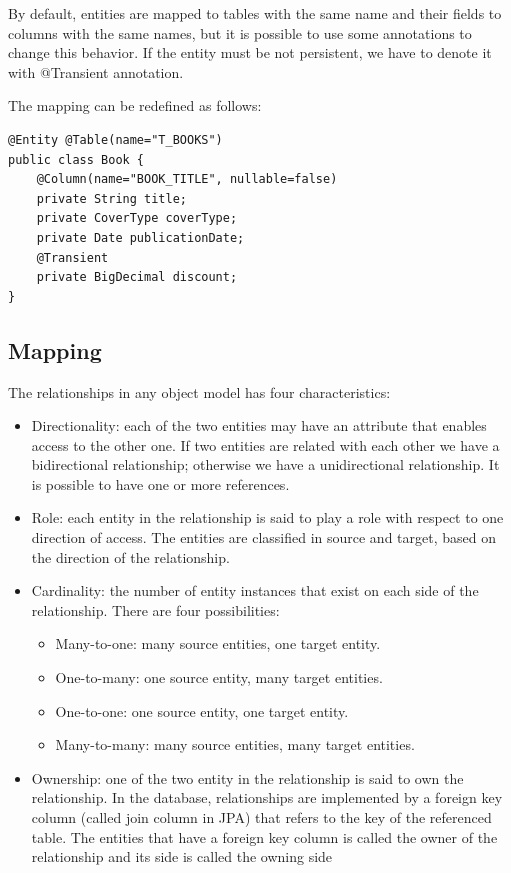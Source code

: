 \documentclass[12pt, a4paper]{report}
\begin{document}
        By default, entities are mapped to tables with the same name and their fields to columns with the same names, but it is possible to use some annotations 
        to change this behavior. If the entity must be not persistent, we have to denote it with @Transient annotation. 
        \begin{example}
            The mapping can be redefined as follows: 
            \begin{lstlisting}[style=Java]
@Entity @Table(name="T_BOOKS")
public class Book {
    @Column(name="BOOK_TITLE", nullable=false)
    private String title;
    private CoverType coverType;
    private Date publicationDate;
    @Transient
    private BigDecimal discount;
}
            \end{lstlisting}
        \end{example}

        \subsection{Mapping}
        The relationships in any object model has four characteristics:
        \begin{itemize}
            \item Directionality: each of the two entities may have an attribute that enables access to the other one. If two entities are related with each other we have 
                a bidirectional relationship; otherwise we have a unidirectional relationship. It is possible to have one or more references. 
            \item Role: each entity in the relationship is said to play a role with respect to one direction of access. The entities are classified in source and target,
                based on the direction of the relationship. 
            \item Cardinality: the number of entity instances that exist on each side of the relationship. There are four possibilities: 
                \begin{itemize}
                    \item Many-to-one: many source entities, one target entity.
                    \item One-to-many: one source entity, many target entities.
                    \item One-to-one: one source entity, one target entity.
                    \item Many-to-many: many source entities, many target entities.
                \end{itemize}
            \item Ownership: one of the two entity in the relationship is said to own the relationship. In the database, relationships are implemented by a foreign key 
                column (called join column in JPA) that refers to the key of the referenced table. The entities that have  a foreign key column is called the owner of 
                the relationship and its side is called the owning side
        \end{itemize}
\end{document}

